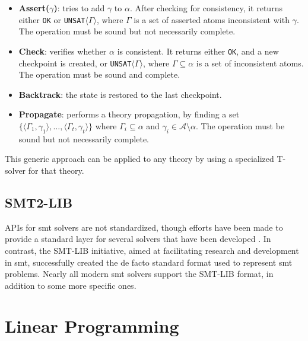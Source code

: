 \begin{itemize}
    \item \textbf{Assert($\gamma$)}: tries to add $\gamma$ to $\alpha$. After checking for consistency, it returns either \texttt{OK} or \texttt{UNSAT}$\langle{\Gamma}\rangle$, where $\Gamma$ is a set of asserted atoms inconsistent with $\gamma$. The operation must be sound but not necessarily complete.
    \item \textbf{Check}: verifies whether $\alpha$ is consistent. It returns either \texttt{OK}, and a new checkpoint is created, or \texttt{UNSAT}$\langle{\Gamma}\rangle$, where $\Gamma \subseteq \alpha$ is a set of inconsistent atoms. The operation must be sound and complete.
    \item \textbf{Backtrack}: the state is restored to the last checkpoint.
    \item \textbf{Propagate}: performs a theory propagation, by finding a set $\{\langle \Gamma_1, \gamma_1 \rangle, \dots, \langle \Gamma_t, \gamma_t \rangle\}$ where $\Gamma_i \subseteq \alpha$ and $\gamma_i \in \mathcal{A} \setminus \alpha$. The operation must be sound but not necessarily complete.
\end{itemize}

This generic approach can be applied to any theory by using a specialized T-solver for that theory.

\subsection*{SMT2-LIB}

APIs for \gls{smt} solvers are not standardized, though efforts have been made to provide a standard layer for several solvers that have been developed \cite{repo:java-smt}.
In contrast, the SMT-LIB initiative, aimed at facilitating research and development in \gls{smt}, successfully created the de facto standard format used to represent \gls{smt} problems.
Nearly all modern \gls{smt} solvers support the SMT-LIB format, in addition to some more specific ones.





\section{Linear Programming}

